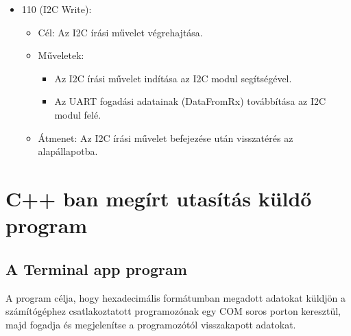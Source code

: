 \documentclass[a4paper,12pt,oneside]{book}
\begin{document}
\begin{itemize}
    \item 110 (I2C Write):
    \begin{itemize}
        \item Cél: Az I2C írási művelet végrehajtása.
        \item Műveletek:
        \begin{itemize}
            \item Az I2C írási művelet indítása az I2C modul segítségével.
            \item Az UART fogadási adatainak (DataFromRx) továbbítása az I2C modul felé.
        \end{itemize}
        \item Átmenet: Az I2C írási művelet befejezése után visszatérés az alapállapotba.
    \end{itemize}
\end{itemize}
\section{C++ ban megírt utasítás küldő program}
\subsection{A Terminal app program}
A program célja, hogy hexadecimális formátumban megadott adatokat küldjön a számítógéphez csatlakoztatott programozónak egy COM soros porton keresztül, majd fogadja és megjelenítse a programozótól visszakapott adatokat.
\end{document}
